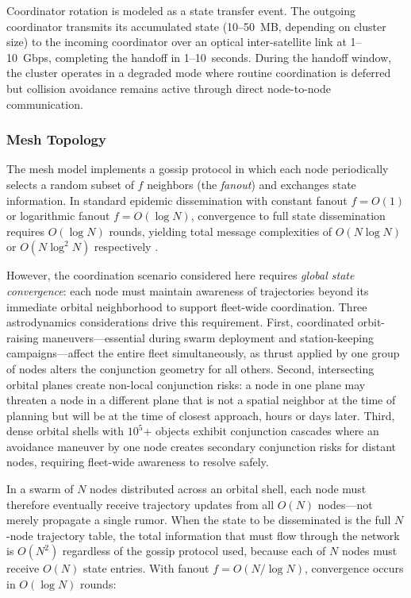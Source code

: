 \documentclass[journal]{IEEEtran}
\begin{document}
Coordinator rotation is modeled as a state transfer event. The outgoing coordinator transmits its accumulated state (10--50~MB, depending on cluster size) to the incoming coordinator over an optical inter-satellite link at 1--10~Gbps, completing the handoff in 1--10~seconds. During the handoff window, the cluster operates in a degraded mode where routine coordination is deferred but collision avoidance remains active through direct node-to-node communication.

\subsubsection{Mesh Topology}

The mesh model implements a gossip protocol in which each node periodically selects a random subset of $f$ neighbors (the \emph{fanout}) and exchanges state information. In standard epidemic dissemination with constant fanout $f = O(1)$ or logarithmic fanout $f = O(\log N)$, convergence to full state dissemination requires $O(\log N)$ rounds, yielding total message complexities of $O(N \log N)$ or $O(N \log^2 N)$ respectively \cite{demers_gossip}.

However, the coordination scenario considered here requires \emph{global state convergence}: each node must maintain awareness of trajectories beyond its immediate orbital neighborhood to support fleet-wide coordination. Three astrodynamics considerations drive this requirement. First, coordinated orbit-raising maneuvers---essential during swarm deployment and station-keeping campaigns---affect the entire fleet simultaneously, as thrust applied by one group of nodes alters the conjunction geometry for all others. Second, intersecting orbital planes create non-local conjunction risks: a node in one plane may threaten a node in a different plane that is not a spatial neighbor at the time of planning but will be at the time of closest approach, hours or days later. Third, dense orbital shells with $10^5$+ objects exhibit conjunction cascades where an avoidance maneuver by one node creates secondary conjunction risks for distant nodes, requiring fleet-wide awareness to resolve safely.

In a swarm of $N$ nodes distributed across an orbital shell, each node must therefore eventually receive trajectory updates from all $O(N)$ nodes---not merely propagate a single rumor. When the state to be disseminated is the full $N$-node trajectory table, the total information that must flow through the network is $O(N^2)$ regardless of the gossip protocol used, because each of $N$ nodes must receive $O(N)$ state entries. With fanout $f = O(N / \log N)$, convergence occurs in $O(\log N)$ rounds:
\end{document}
